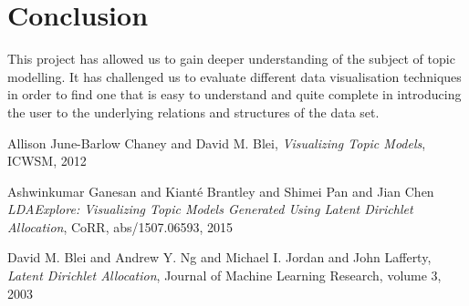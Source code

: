 \documentclass[11pt]{article}
\begin{document}

\section{Conclusion}
%

This project has allowed us to gain deeper understanding of the subject of topic modelling. It has challenged us to evaluate different data visualisation techniques in order to find one that is easy to understand and quite complete in introducing the user to the underlying relations and structures of the data set.

\begin{thebibliography}{9}
  
  Allison June-Barlow Chaney and David M. Blei,
  \textit{Visualizing Topic Models},
  ICWSM,
  2012
  
    
  Ashwinkumar Ganesan and Kiant{\'e} Brantley and Shimei Pan and Jian Chen
  \textit{LDAExplore: Visualizing Topic Models Generated Using Latent Dirichlet Allocation},
  CoRR,
  abs/1507.06593,
  2015

  
    David M. Blei and Andrew Y. Ng and Michael I. Jordan and John Lafferty,
    \textit{Latent Dirichlet Allocation},
    Journal of Machine Learning Research, volume 3,
    2003

\end{thebibliography}
 
\end{document}
